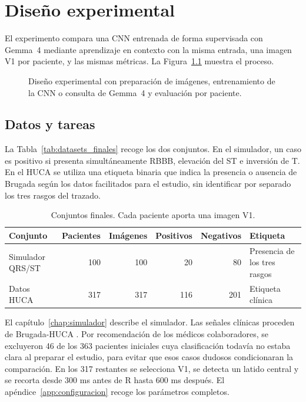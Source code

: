 \chapter{Diseño experimental}
\label{chap:diseno}

El experimento compara una CNN entrenada de forma supervisada con Gemma~4 mediante aprendizaje en contexto con la misma entrada, una imagen V1 por paciente, y las mismas métricas. La Figura~\ref{fig:diseno_experimental_resumen} muestra el proceso.

\begin{figure}[H]
  \centering
  \caption{Diseño experimental con preparación de imágenes, entrenamiento de la CNN o consulta de Gemma~4 y evaluación por paciente.}
  \label{fig:diseno_experimental_resumen}
\end{figure}

\section{Datos y tareas}
\label{sec:datos_tareas}

La Tabla~\ref{tab:datasets_finales} recoge los dos conjuntos. En el simulador, un caso es positivo si presenta simultáneamente RBBB, elevación del ST e inversión de T. En el HUCA se utiliza una etiqueta binaria que indica la presencia o ausencia de Brugada según los datos facilitados para el estudio, sin identificar por separado los tres rasgos del trazado.

\begin{table}[H]
  \centering
  \small
  \begin{tabularx}{\textwidth}{p{3cm}rrrr>{\raggedright\arraybackslash}X}
    \toprule
    Conjunto & Pacientes & Imágenes & Positivos & Negativos & Etiqueta \\
    \midrule
    Simulador QRS/ST & 100 & 100 & 20 & 80 & Presencia de los tres rasgos \\
    Datos HUCA & 317 & 317 & 116 & 201 & Etiqueta clínica \\
    \bottomrule
  \end{tabularx}
  \caption{Conjuntos finales. Cada paciente aporta una imagen V1.}
  \label{tab:datasets_finales}
  \label{tab:huca_datos_finales}
\end{table}

El capítulo~\ref{chap:simulador} describe el simulador. Las señales clínicas proceden de Brugada-HUCA \cite{costacortez2026brugada}. Por recomendación de los médicos colaboradores, se excluyeron 46 de los 363 pacientes iniciales cuya clasificación todavía no estaba clara al preparar el estudio, para evitar que esos casos dudosos condicionaran la comparación. En los 317 restantes se selecciona V1, se detecta un latido central y se recorta desde 300 ms antes de R hasta 600 ms después. El apéndice~\ref{app:configuracion} recoge los parámetros completos.


